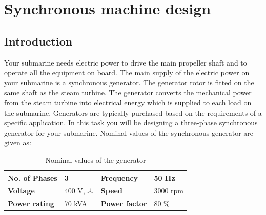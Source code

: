 \documentclass[class=article, crop=false]{standalone}
\newcommand{\wye}{\mathbin{\tikz[x=1ex,y=1ex]{\draw[line width=.1ex] (0,0)--(30:1)--++(-30:1) (30:1)--++(0,1);}}}
\begin{document}
\section{Synchronous machine design}

\subsection{Introduction}

Your submarine needs electric power to drive the main propeller shaft and to operate all the equipment on board. The main supply of the electric power on your submarine is a synchronous generator. The generator rotor is fitted on the same shaft as the steam turbine. The generator converts the mechanical power from the steam turbine into electrical energy which is supplied to each load on the submarine. Generators are typically purchased based on the requirements of a specific application. In this task you will be designing a three-phase synchronous generator for your submarine. Nominal values of the synchronous generator are given as: 
\begin{table}[h!]
    \caption{Nominal values of the generator}
    \label{tab:nominalValues}
    \begin{tabularx}{\textwidth}{|Y|Y|Y|Y|} \hline
    \textbf{No. of Phases} & 3 & \textbf{Frequency} & 50 Hz \\ \hline \textbf{Voltage} & 400 V, {\Large $\wye$} & \textbf{Speed} & 3000 rpm \\ \hline
    \textbf{Power rating} & 70 kVA & \textbf{Power factor} & 80 \% \\ \hline
    \end{tabularx}
\end{table}
\end{document}

